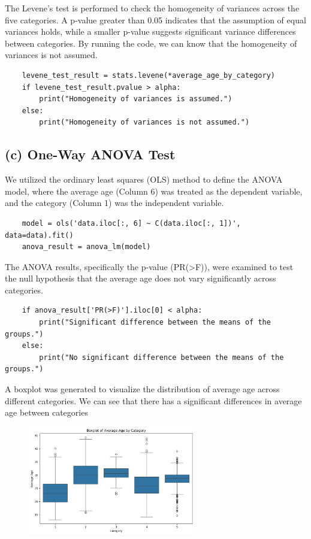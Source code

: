\documentclass[12pt]{article}
\begin{document}
The Levene's test is performed to check the homogeneity of variances across the five categories. A p-value greater than 0.05 indicates that the assumption of equal variances holds, while a smaller p-value suggests significant variance differences between categories.
By running the code, we can know that the homogeneity of variances is not assumed.
\begin{verbatim}
    levene_test_result = stats.levene(*average_age_by_category)
    if levene_test_result.pvalue > alpha:
        print("Homogeneity of variances is assumed.")
    else:
        print("Homogeneity of variances is not assumed.")
\end{verbatim}

\subsection*{(c) One-Way ANOVA Test}

We utilized the ordinary least squares (OLS) method to define the ANOVA model, where the average age (Column 6) was treated as the dependent variable, and the category (Column 1) was the independent variable.


\begin{verbatim}
    model = ols('data.iloc[:, 6] ~ C(data.iloc[:, 1])', data=data).fit()
    anova_result = anova_lm(model)
\end{verbatim}
The ANOVA results, specifically the p-value (PR(>F)), were examined to test the null hypothesis that the average age does not vary significantly across categories.

\begin{verbatim}
    if anova_result['PR(>F)'].iloc[0] < alpha:
        print("Significant difference between the means of the groups.")
    else:
        print("No significant difference between the means of the groups.")
\end{verbatim}

A boxplot was generated to visualize the distribution of average age across different categories. We can see that there has a significant differences in average age between categories

\begin{figure}[h]
    \centering
    \includegraphics[width=0.65\textwidth]{image/output2.png}  
    \label{fig:Output for ANOVA test}
\end{figure}
\end{document}
